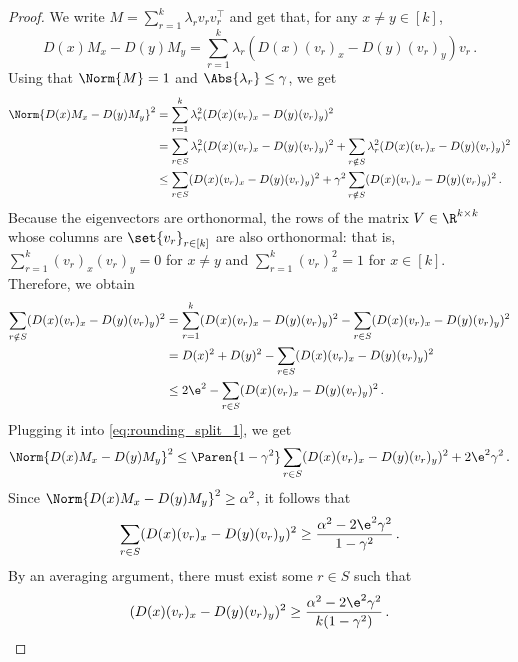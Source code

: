 \begin{proof}
    We write $M = \sum_{r=1}^k \lambda_r v_r v_r^{\top}$ and get that, for any $x \neq y \in [k]$,
    \begin{equation*}
        D(x) M_x - D(y) M_y=\sum_{r=1}^k \lambda_r (D(x) (v_r)_x - D(y) (v_r)_y)v_r \,.
    \end{equation*}
    Using that $\Norm{M}=1$ and $\Abs{\lambda_r}\leq \gamma$, we get
    \begin{align}
    \label{eq:rounding_split_1}
        \begin{split}
            \Norm{D(x) M_x- D(y) M_y}^2
            &=\sum_{r=1}^k \lambda_r^2 (D(x) (v_r)_x - D(y)(v_r)_y)^2 \\
            &=\sum_{r\in S} \lambda_r^2 (D(x) (v_r)_x - D(y)(v_r)_y)^2+\sum_{r\notin S} \lambda_r^2 (D(x) (v_r)_x - D(y)(v_r)_y)^2 \\
            &\leq \sum_{r\in S} (D(x) (v_r)_x- D(y) (v_r)_y)^2+\gamma^2\sum_{r\notin S} (D(x) (v_r)_x- D(y) (v_r)_y)^2 \,.
        \end{split}
    \end{align}
    Because the eigenvectors are orthonormal, the rows of the matrix $V \in \R^{k \times k}$ whose columns are $\set{v_{r}}_{r \in [k]}$ are also orthonormal: that is, $\sum_{r=1}^{k} (v_r)_x (v_r)_y = 0$ for $x \neq y$ and $\sum_{r=1}^{k} (v_r)_x^2 = 1$ for $x \in [k]$.
    Therefore, we obtain
    \begin{align*}
        \sum_{r \notin S} (D(x) (v_r)_x- D(y) (v_r)_y)^2
        & = \sum_{r=1}^k (D(x) (v_r)_x- D(y) (v_r)_y)^2 - \sum_{r \in S} (D(x) (v_r)_x- D(y) (v_r)_y)^2 \\
        & = D(x)^2 + D(y)^2 - \sum_{r \in S} (D(x) (v_r)_x- D(y) (v_r)_y)^2 \\
        & \leq 2\e^2 - \sum_{r \in S} (D(x) (v_r)_x- D(y) (v_r)_y)^2 \,.
    \end{align*}
    Plugging it into \cref{eq:rounding_split_1}, we get
    \begin{equation*}
        \Norm{D(x) M_x- D(y) M_y}^2
        \leq \Paren{1-\gamma^2} \sum_{r \in S} (D(x) (v_r)_x- D(y) (v_r)_y)^2 + 2 \e^2 \gamma^2 \,.
    \end{equation*}
    Since $\Norm{D(x)M_x-D(y)M_y}^2\geq \alpha^2$, it follows that
    \begin{equation*}
        \sum_{r \in S} (D(x) (v_r)_x- D(y) (v_r)_y)^2 \geq \frac{\alpha^2 - 2\e^2\gamma^2}{1-\gamma^2} \,.
    \end{equation*}
    By an averaging argument, there must exist some $r \in S$ such that
    \begin{equation*}
        (D(x) (v_r)_x- D(y) (v_r)_y)^2 \geq \frac{\alpha^2 - 2\e^2\gamma^2}{k(1-\gamma^2)} \,.
    \end{equation*}
\end{proof}

